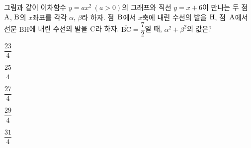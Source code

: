 \noindent\begin{minipage}[t]{0.58\linewidth}\vspace{0pt}\raggedright 그림과 같이 이차함수 $y=ax^2\ (a>0)$의 그래프와 직선 $y=x+6$이 만나는 두 점~$\mathrm{A}$, $\mathrm{B}$의 $x$좌표를 각각 $\alpha$, $\beta$라 하자. 점~$\mathrm{B}$에서 $x$축에 내린 수선의 발을 $\mathrm{H}$, 점~$\mathrm{A}$에서 선분 $\mathrm{BH}$에 내린 수선의 발을 $\mathrm{C}$라 하자. $\overline{\mathrm{BC}}=\dfrac{7}{2}$일 때, $\alpha^2+\beta^2$의 값은? \cond{$\alpha<\beta$}\end{minipage}\hfill\begin{minipage}[t]{0.4\linewidth}\vspace{0pt}\centering \resizebox{\ifdim\width>\linewidth\linewidth\else\width\fi}{!}{}\end{minipage}\par
\begin{choices32}{\rule[-3ex]{0pt}{8ex}$\dfrac{23}{4}$}{\rule[-3ex]{0pt}{8ex}$\dfrac{25}{4}$}{\rule[-3ex]{0pt}{8ex}$\dfrac{27}{4}$}{\rule[-3ex]{0pt}{8ex}$\dfrac{29}{4}$}{\rule[-3ex]{0pt}{8ex}$\dfrac{31}{4}$}\end{choices32}
